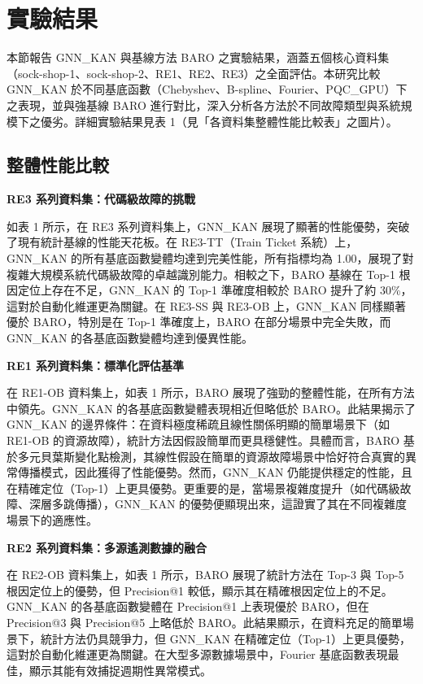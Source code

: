 \documentclass[10pt,a4paper,twocolumn]{article}
\begin{document}
\section{實驗結果}

本節報告 GNN\_KAN 與基線方法 BARO 之實驗結果，涵蓋五個核心資料集（sock-shop-1、sock-shop-2、RE1、RE2、RE3）之全面評估。本研究比較 GNN\_KAN 於不同基底函數（Chebyshev、B-spline、Fourier、PQC\_GPU）下之表現，並與強基線 BARO 進行對比，深入分析各方法於不同故障類型與系統規模下之優劣。詳細實驗結果見表 1（見「各資料集整體性能比較表」之圖片）。

\subsection{整體性能比較}

\textbf{RE3 系列資料集：代碼級故障的挑戰}

如表 1 所示，在 RE3 系列資料集上，GNN\_KAN 展現了顯著的性能優勢，突破了現有統計基線的性能天花板。在 RE3-TT（Train Ticket 系統）上，GNN\_KAN 的所有基底函數變體均達到完美性能，所有指標均為 1.00，展現了對複雜大規模系統代碼級故障的卓越識別能力。相較之下，BARO 基線在 Top-1 根因定位上存在不足，GNN\_KAN 的 Top-1 準確度相較於 BARO 提升了約 30\%，這對於自動化維運更為關鍵。在 RE3-SS 與 RE3-OB 上，GNN\_KAN 同樣顯著優於 BARO，特別是在 Top-1 準確度上，BARO 在部分場景中完全失敗，而 GNN\_KAN 的各基底函數變體均達到優異性能。

\textbf{RE1 系列資料集：標準化評估基準}

在 RE1-OB 資料集上，如表 1 所示，BARO 展現了強勁的整體性能，在所有方法中領先。GNN\_KAN 的各基底函數變體表現相近但略低於 BARO。此結果揭示了 GNN\_KAN 的邊界條件：在資料極度稀疏且線性關係明顯的簡單場景下（如 RE1-OB 的資源故障），統計方法因假設簡單而更具穩健性。具體而言，BARO 基於多元貝葉斯變化點檢測，其線性假設在簡單的資源故障場景中恰好符合真實的異常傳播模式，因此獲得了性能優勢。然而，GNN\_KAN 仍能提供穩定的性能，且在精確定位（Top-1）上更具優勢。更重要的是，當場景複雜度提升（如代碼級故障、深層多跳傳播），GNN\_KAN 的優勢便顯現出來，這證實了其在不同複雜度場景下的適應性。

\textbf{RE2 系列資料集：多源遙測數據的融合}

在 RE2-OB 資料集上，如表 1 所示，BARO 展現了統計方法在 Top-3 與 Top-5 根因定位上的優勢，但 Precision@1 較低，顯示其在精確根因定位上的不足。GNN\_KAN 的各基底函數變體在 Precision@1 上表現優於 BARO，但在 Precision@3 與 Precision@5 上略低於 BARO。此結果顯示，在資料充足的簡單場景下，統計方法仍具競爭力，但 GNN\_KAN 在精確定位（Top-1）上更具優勢，這對於自動化維運更為關鍵。在大型多源數據場景中，Fourier 基底函數表現最佳，顯示其能有效捕捉週期性異常模式。
\end{document}
